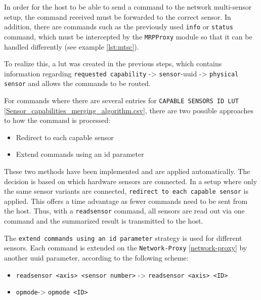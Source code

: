 In order for the host to be able to send a command to the network
multi-sensor setup, the command received must be forwarded to the
correct sensor. In addition, there are commands such as the previously
used \passthrough{\lstinline!info!} or \passthrough{\lstinline!status!}
command, which must be intercepted by the
\passthrough{\lstinline!MRPProxy!} module so that it can be handled
differently (see example \ref{lst:mtsc}).

To realize this, a \gls{lut} was created in the previous steps, which
contains information regarding
\passthrough{\lstinline!requested capability!} -\textgreater{}
\passthrough{\lstinline!sensor!}-\gls{uuid} -\textgreater{}
\passthrough{\lstinline!physical sensor!} and allows the commands to be
routed.

For commands where there are several entries for
\passthrough{\lstinline!CAPABLE SENSORS ID LUT!}
\ref{Sensor_capabilities_merging_algorithm.csv}, there are two possible
approaches to how the command is processed:

\begin{itemize}
\tightlist
\item
  Redirect to each capable sensor
\item
  Extend commands using an id parameter
\end{itemize}

These two methods have been implemented and are applied automatically.
The decision is based on which hardware sensors are connected. In a
setup where only the same sensor variants are connected,
\passthrough{\lstinline!redirect to each capable sensor!} is applied.
This offers a time advantage as fewer commands need to be sent from the
host. Thus, with a \passthrough{\lstinline!readsensor!} command, all
sensors are read out via one command and the summarized result is
transmitted to the host.

The \passthrough{\lstinline!extend commands using an id parameter!}
strategy is used for different sensors. Each command is extended on the
\passthrough{\lstinline!Network-Proxy!} \ref{network-proxy} by another
\gls{uuid} parameter, according to the following scheme:

\begin{itemize}
\tightlist
\item
  \passthrough{\lstinline!readsensor <axis> <sensor number>!}
  -\textgreater{} \passthrough{\lstinline!readsensor <axis> <ID>!}
\item
  \passthrough{\lstinline!opmode!}-\textgreater{}
  \passthrough{\lstinline!opmode <ID>!}
\end{itemize}


